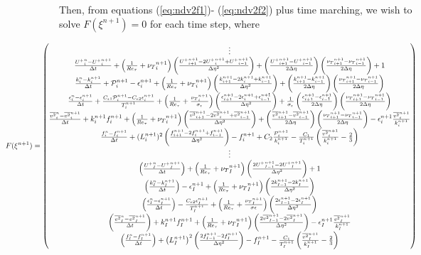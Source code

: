 \documentclass[12pt]{article}
\newcommand{\ep}{\epsilon} \newcommand{\noi}{\noindent}
\newcommand{\secDif}[1]{ \left( \frac{ {#1}_{i+1}^{n+1} - 2 {#1}_{i}^{n+1} +
{#1}_{i-1}^{n+1} }{\Delta \eta^2} \right) }
\newcommand{\secDifEnd}[1]{\left( \frac{2 {#1}_{I-1}^{n+1} - 2 {#1}_I^{n+1}
}{\Delta \eta^2 } \right)}
\newcommand{\Dif}[1]{ \left( \frac{ {#1}_{i+1}^{n+1} - {#1}_{i-1}^{n+1}}{ 2\Delta
\eta} \right)}
\newcommand{\tDif}[1]{ \frac{ {#1}_i^{n} - {#1}_i^{n+1}}{\Delta t}}
\newcommand{\tDifEnd}[1]{ \left( \frac{ {#1}_{I}^{n} - {#1}_I^{n+1}}{\Delta t }
\right)}
\begin{document}
\noi Then, from equations
(\ref{eq:ndv2f1})- (\ref{eq:ndv2f2}) plus time marching, we wish to solve
$F(\xi^{n+1})=0$ for each time step, where  

\begin{equation*}
	\hspace{-1in}
	F(\xi^{n+1}) = \left(
	\begin{matrix} 
		\vdots \\
		\tDif{U^+} + \left(
		\frac{1}{Re_\tau} + {\nu_T}_i^{n+1} \right) \secDif{ {U^+}} +
		\Dif{ U^+} \Dif{\nu_T} + 1 \\ 
		\tDif{k} + \mathcal{P}_i^{n+1} - \ep_i^{n+1} + \left( \frac{1}{Re_\tau} +
		{\nu_T}_{i}^{n+1} \right) \secDif{k} + \Dif{k} \Dif{\nu_T} \\
		\tDif{\ep} +\frac{C_{\ep 1} \mathcal{P}_i^{n+1} -  C_{\ep 2}
		\ep_{i}^{n+1}}{T_i^{n+1}} + \left( \frac{1}{Re_\tau} +
		\frac{ {\nu_T}_{i}^{n+1}}{\sigma_\ep} \right) \secDif{\ep} +
		\frac{1}{\sigma_\ep} \Dif{\ep} \Dif{\nu_T} \\ 
		\tDif{\overline{v^2}} + k_i^{n+1} f_i^{n+1} + \left( \frac{1}{Re_\tau} +
		{\nu_T}_i^{n+1}  \right) \secDif{\overline{v^2}} +
		\Dif{\overline{v^2}} \Dif{\nu_T} - \ep_i^{n+1}
		\frac{ {\overline{v^2}_i^{n+1}}}{k_i^{n+1}} \\
		\tDif{f} + (L_i^{n+1})^2 \secDif{f} - f_i^{n+1} + C_2
		\frac{\mathcal{P}_i^{n+1}}{k_i^{n+1}} -
		\frac{C_1}{T_i^{n+1}} \left( \frac{
			{\overline{v^2}}_i^{n+1}}{k_i^{n+1}} -
			\frac{2}{3} \right) \\
		\vdots \\
		\tDifEnd{U^+} + \left( \frac{1}{Re_\tau} + {\nu_T}_I^{n+1}
		\right) \secDifEnd{U^+} + 1 \\ 
		\tDifEnd{k} - \ep_{I}^{n+1} + \left(
		\frac{1}{Re_\tau} + {\nu_T}_I^{n+1}\right) \secDifEnd{k} \\
		\tDifEnd{\ep} - \frac{C_{\ep 2}
		\ep_I^{n+1}}{T_I^{n+1}} + \left( \frac{1}{Re_\tau} +
		\frac{ {\nu_T}_I^{n+1}}{\sigma \ep} \right) \secDifEnd{\ep} \\
		\tDifEnd{\overline{v^2}} + k_I^{n+1} f_{I}^{n+1} + \left(
		\frac{1}{Re_\tau} + {\nu_T}_I^{n+1} \right)
		\secDifEnd{\overline{v^2}} -\ep_I^{n+1}
		\frac{\overline{v^2}_I^{n+1}}{k_I^{n+1}}\\
		\tDifEnd{f} + \left( L_I^{n+1} \right)^2 \secDifEnd{f} -
		f_I^{n+1} - \frac{C_1}{T_{I}^{n+1}} \left(
		\frac{\overline{v^2}_I^{n+1}}{k_I^{n+1}} - \frac{2}{3} \right)
	\end{matrix}
	\right)
\end{equation*}
\end{document}
